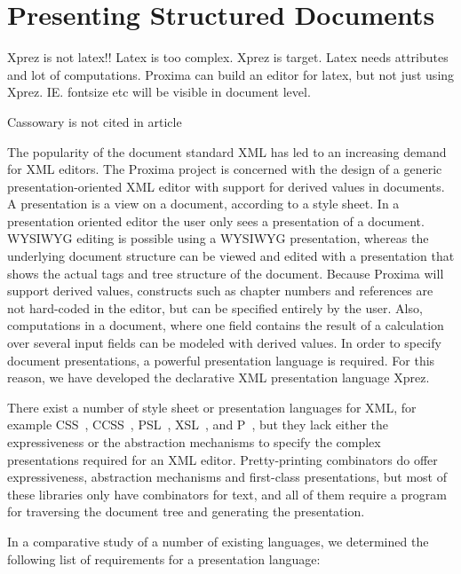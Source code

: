 
\chapter{Presenting Structured Documents}
\label{chap:presenting}

Xprez is not latex!! Latex is too complex. Xprez is target. Latex needs attributes and lot of computations. Proxima can build an editor for latex, but not just using Xprez. IE. fontsize etc will be visible in document level.

Cassowary is not cited in article



The popularity of the document standard XML has led to an increasing demand for XML editors. The Proxima project is concerned with the design of a generic presentation-oriented XML editor with support for derived values in documents. A presentation is a view on a document, according to a style sheet. In a presentation oriented editor the user only sees a presentation of a document. WYSIWYG editing is possible using a WYSIWYG presentation, whereas the underlying document structure can be viewed and edited with a presentation that shows the actual tags and tree structure of the document. Because Proxima will support derived values, constructs such as chapter numbers and references are not hard-coded in the editor, but can be specified entirely by the user. Also, computations in a document, where one field contains the result of a calculation over several input fields can be modeled with derived values. In order to specify document presentations, a powerful presentation language is required. For this reason, we have developed the declarative XML presentation language {\sc Xprez}.

There exist a number of style sheet or presentation languages for XML, for example CSS~\cite{css}, CCSS~\cite{ccss}, PSL~\cite{psl}, XSL~\cite{xsl}, and P~\cite{thot}, but they lack either the expressiveness or the abstraction mechanisms to specify the complex presentations required for an XML editor. Pretty-printing combinators \cite{oppen,swierstra,hughes,kahl,brand} do offer expressiveness, abstraction mechanisms and first-class presentations, but most of these libraries only have combinators for text, and all of them require a program for traversing the document tree and generating the presentation. 

In a comparative study of a number of existing languages, we determined the following list of requirements for a presentation language:

